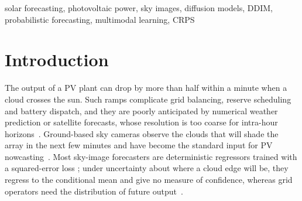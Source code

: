 \documentclass[conference]{IEEEtran}
\newcommand{\ddimcrps}{1.222}
\begin{document}
\maketitle

\begin{abstract}
PV-MM-Diffusion, an end-to-end multimodal diffusion model that jointly generates future sky images and photovoltaic
(PV) power, has been reported to improve 15-minute-ahead probabilistic PV forecasting with 60-step DPM-Solver++
sampling, a multi-GPU training budget and a test set of multi-cloud days. We study this model class under cheaper and
more demanding conditions: a compact re-implementation that keeps the coupled U-Net, Random-Shift PV Multi-Modal
Attention (RS-PV-MMA) and empty-frame placeholder training, is trained on a single 8~GB RTX~3070 and is sampled with a
15-step Denoising Diffusion Implicit Model (DDIM) solver. The model and all baselines are scored on the same 1{,}340
all-sky test windows of the SKIPP'D benchmark. A 30-member ensemble attains a continuous ranked probability score
(CRPS) of \SI{\ddimcrps}{kW}, a 7.5\% skill over smart persistence and an 18.4\% reduction relative to a two-stage
video-then-PV pipeline, at \SI{155}{ms} per member; without sky images the CRPS rises to \SI{2.072}{kW}. However,
the ensemble median has a higher mean absolute error than persistence (\SI{1.684}{} vs.\ \SI{1.321}{kW}) and a
negative bias, and nominal 90\% intervals cover only 77.9\% of observations. Diffusion models therefore add value
mainly through spread rather than sharper point forecasts, and calibration and bias are the main targets for future
work.
\end{abstract}

\begin{IEEEkeywords}
solar forecasting, photovoltaic power, sky images, diffusion models, DDIM, probabilistic forecasting, multimodal learning, CRPS
\end{IEEEkeywords}

\section{Introduction}
The output of a PV plant can drop by more than half within a minute when a cloud crosses the sun. Such ramps
complicate grid balancing, reserve scheduling and battery dispatch, and they are poorly anticipated by numerical
weather prediction or satellite forecasts, whose resolution is too coarse for intra-hour
horizons~\cite{antonanzas2016review}. Ground-based sky cameras observe the clouds that will shade the array in the next few
minutes and have become the standard input for PV nowcasting~\cite{sun2019sunset,paletta2023advances}. Most
sky-image forecasters are deterministic regressors trained with a squared-error loss
\cite{sun2019sunset,paletta2021benchmarking}; under uncertainty about where a cloud edge will be, they regress to the
conditional mean and give no measure of confidence, whereas grid operators need the distribution of future
output~\cite{vandermeer2018review}.
\end{document}
